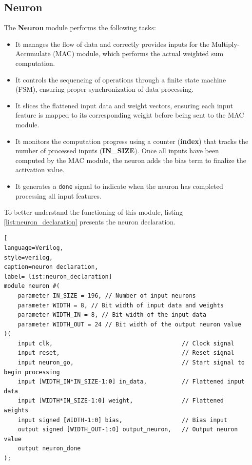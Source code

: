 \documentclass[11pt]{report}
\begin{document}
\subsection{Neuron}

The \textbf{Neuron} module performs the following tasks:

\begin{itemize}
    \item It manages the flow of data and correctly provides inputs for the Multiply-Accumulate (MAC) module, which performs the actual weighted sum computation.
    \item It controls the sequencing of operations through a finite state machine (FSM), ensuring proper synchronization of data processing.
    \item It slices the flattened input data and weight vectors, ensuring each input feature is mapped to its corresponding weight before being sent to the MAC module.
    \item It monitors the computation progress using a counter (\textbf{index}) that tracks the number of processed inputs (\textbf{IN\_SIZE}). Once all inputs have been computed by the MAC module, the neuron adds the bias term to finalize the activation value.
    \item It generates a \texttt{done} signal to indicate when the neuron has completed processing all input features.
\end{itemize}

To better understand the functioning of this module, listing \ref{list:neuron_declaration} presents the neuron declaration.  

\begin{lstlisting}[
language=Verilog,
style=verilog,
caption=neuron declaration,
label= list:neuron_declaration]
module neuron #(
    parameter IN_SIZE = 196, // Number of input neurons
    parameter WIDTH = 8, // Bit width of input data and weights
    parameter WIDTH_IN = 8, // Bit width of the input data
    parameter WIDTH_OUT = 24 // Bit width of the output neuron value
)(
    input clk,                                     // Clock signal
    input reset,                                   // Reset signal
    input neuron_go,                               // Start signal to begin processing
    input [WIDTH_IN*IN_SIZE-1:0] in_data,          // Flattened input data
    input [WIDTH*IN_SIZE-1:0] weight,              // Flattened weights
    input signed [WIDTH-1:0] bias,                 // Bias input
    output signed [WIDTH_OUT-1:0] output_neuron,   // Output neuron value
    output neuron_done
);    
\end{lstlisting}
\end{document}
